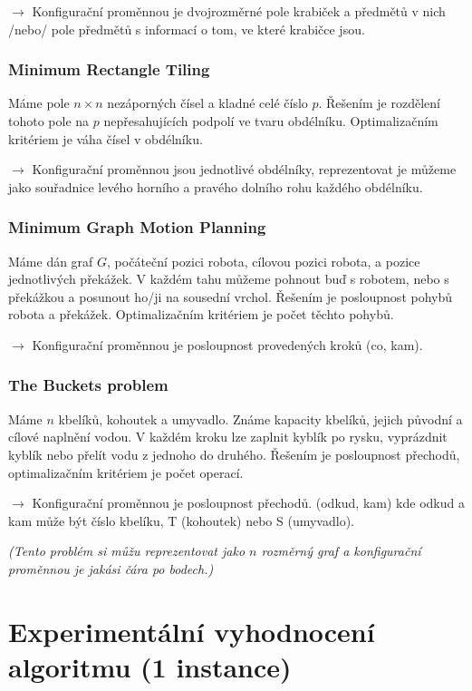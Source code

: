 $\to$ Konfigurační proměnnou je dvojrozměrné pole krabiček a předmětů v nich /nebo/ pole předmětů s informací o tom, ve které krabičce jsou.

\subsubsection{Minimum Rectangle Tiling}

Máme pole $n \times n$ nezáporných čísel a kladné celé číslo $p$. Řešením je rozdělení tohoto pole na $p$ nepřesahujících podpolí ve tvaru obdélníku. Optimalizačním kritériem je váha čísel v obdélníku.

$\to$ Konfigurační proměnnou jsou jednotlivé obdélníky, reprezentovat je může\-me jako souřadnice levého horního a pravého dolního rohu každého obdélníku.

\subsubsection{Minimum Graph Motion Planning}

Máme dán graf $G$, počáteční pozici robota, cílovou pozici robota, a pozice jednotlivých překážek. V každém tahu můžeme pohnout buď s robotem, nebo s překážkou a posunout ho/ji na sousední vrchol. Řešením je posloupnost pohybů robota a překážek. Optimalizačním kritériem je počet těchto pohybů.

$\to$ Konfigurační proměnnou je posloupnost provedených kroků (co, kam).

\subsubsection{The Buckets problem}

Máme $n$ kbelíků, kohoutek a umyvadlo. Známe kapacity kbelíků, jejich původní a cílové naplnění vodou. V každém kroku lze zaplnit kyblík po rysku, vyprázdnit kyblík nebo přelít vodu z jednoho do druhého. Řešením je posloupnost přechodů, optimalizačním kritériem je počet operací.

$\to$ Konfigurační proměnnou je posloupnost přechodů. (odkud, kam) kde odkud a kam může být číslo kbelíku, T (kohoutek) nebo S (umyvadlo).

\textit{(Tento problém si můžu reprezentovat jako $n$ rozměrný graf a konfigurační proměnnou je jakási čára po bodech.)}

\section{Experimentální vyhodnocení algoritmu (1 instance)}

